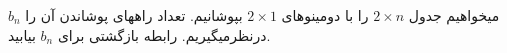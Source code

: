 \exercise
میخواهیم جدول 
$2 \times n$
را با دومینوهای 
$2 \times 1$
بپوشانیم. تعداد راههای پوشاندن آن را 
$b_n$
 درنظرمیگیریم. رابطه
 بازگشتی برای 
$b_n$
  بیابید.